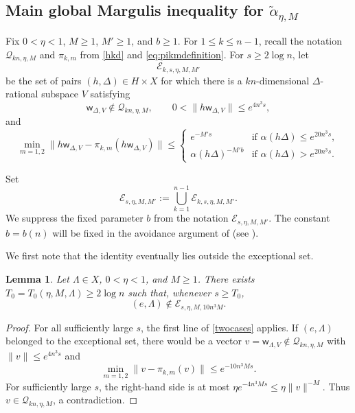 \documentclass[reqno,11pt]{amsart}
\numberwithin{equation}{section}
\newtheorem{lemma}[theorem]{Lemma}
\theoremstyle{definition}
\theoremstyle{remark}
\begin{document}
\subsection{Main global Margulis inequality for $\widetilde{\alpha}_{\eta,M}$}\label{subsec:globalMargulis}

Fix $0<\eta<1$, $M\ge1$, $M'\ge1$, and $b\ge1$. 
For $1\le k\le n-1$, recall the notation
$\mathscr Q_{kn,\eta,M}$ and $\pi_{k,m}$ from
\eqref{hkd} and \eqref{eq:pikmdefinition}.
For 
$s\ge 2\log n$, let
$$\mathcal E_{ k ,s,\eta,M,M'}$$ be the set of pairs
$(h,\Delta)\in H\times X$ for which there is a $kn$-dimensional
$\Delta$-rational subspace $V$ satisfying
$$
\mathsf w_{\Delta,V}\notin
\mathscr Q_{ k  n,\eta,M},
\qquad
0<\|h\mathsf w_{\Delta,V}\|
\le e^{4n^3s},
$$
and
\begin{equation}\label{twocases}
\min_{m=1,2}
\|h\mathsf w_{\Delta,V}
-
\pi_{ k ,m}(h\mathsf w_{\Delta,V})\|
\le \begin{cases}
e^{-M's}
&\text{if } \alpha(h\Delta)
\le e^{20n^3s},\\ 
\alpha(h\Delta)^{-M'b}
&\text{if }\alpha(h\Delta)
>e^{20n^3s}.
\end{cases}
\end{equation}

Set
\begin{equation}\label{eq:exceptional-set-definition}
\mathcal E_{s,\eta,M,M'}
:=
\bigcup_{ k =1}^{n-1}
\mathcal E_{ k ,s,\eta,M,M'}.
\end{equation}
We suppress the fixed parameter $b$ from the notation
$\mathcal E_{s,\eta,M,M'}$.
The constant $b=b(n)$ will be fixed in the avoidance argument of  (see ). 

We first note that the identity eventually lies outside the exceptional set.

\begin{lemma}\label{lem:quasinullatidentity}
Let $\Lambda\in X$, $0<\eta<1$, and $M\ge1$. There exists
$T_0=T_0(\eta,M,\Lambda)\ge 2\log n$ such that, whenever $s\ge T_0$,
$$
(e,\Lambda)\notin
\mathcal E_{s,\eta,M,10n^3M}.
$$
\end{lemma}

\begin{proof}
For all sufficiently large $s$, the first line of
\eqref{twocases} applies. If $(e,\Lambda)$ belonged to the
exceptional set, there would be a vector
$v=\mathsf w_{\Lambda,V}\notin
\mathscr Q_{ k  n,\eta,M}$ with
$\|v\|\le e^{4n^3s}$ and
$$
\min_{m=1,2}\|v-\pi_{ k ,m}(v)\|
\le e^{-10n^3Ms}.
$$
For sufficiently large $s$, the right-hand side is at most
$\eta e^{-4n^3Ms}\le\eta\|v\|^{-M}$. Thus
$v\in\mathscr Q_{ k  n,\eta,M}$, a contradiction.
\end{proof}
\end{document}
